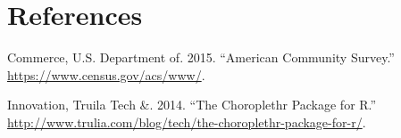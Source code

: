 \documentclass[]{article}
\begin{document}
\newpage

\section*{References}\label{references}

\hypertarget{refs}{}
\hypertarget{ref-ACS2014}{}
Commerce, U.S. Department of. 2015. ``American Community Survey.''
\url{https://www.census.gov/acs/www/}.

\hypertarget{ref-tru2014}{}
Innovation, Truila Tech \&. 2014. ``The Choroplethr Package for R.''
\url{http://www.trulia.com/blog/tech/the-choroplethr-package-for-r/}.
\end{document}
